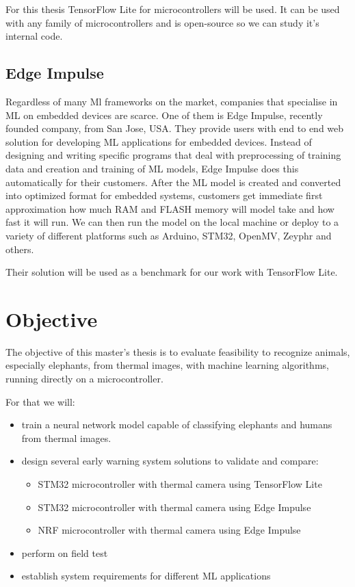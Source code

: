 For this thesis TensorFlow Lite for microcontrollers will be used. 
It can be used with any family of microcontrollers and is open-source so we can study it's internal code.


\subsection{ Edge Impulse}

Regardless of many Ml frameworks on the market, companies that specialise in ML on embedded devices are scarce.
One of them is Edge Impulse, recently founded company, from San Jose, USA.
They provide users with end to end web solution for developing ML applications for embedded devices.
Instead of designing and writing specific programs that deal with preprocessing of training data and creation and training of ML models, Edge Impulse does this automatically for their customers.
After the ML model is created and converted into optimized format for embedded systems, customers get immediate first approximation how much RAM and FLASH memory will model take and how fast it will run.
We can then run the model on the local machine or deploy to a variety of different platforms such as Arduino, STM32, OpenMV, Zeyphr and others.


Their solution will be used as a benchmark for our work with TensorFlow Lite.


\section{ Objective}

The objective of this master's thesis is to evaluate feasibility to recognize animals, especially elephants, from thermal images, with machine learning algorithms, running directly on a microcontroller.

For that we will:

\begin{itemize}
    \item train a neural network model capable of classifying elephants and humans from thermal images.
    \item design several early warning system solutions to validate and compare:
    \begin{itemize}
        \item STM32 microcontroller with thermal camera using TensorFlow Lite
        \item STM32 microcontroller with thermal camera using Edge Impulse
        \item NRF microcontroller with thermal camera using Edge Impulse
    \end{itemize}
    \item perform on field test
    \item establish system requirements for different ML applications
\end{itemize}


